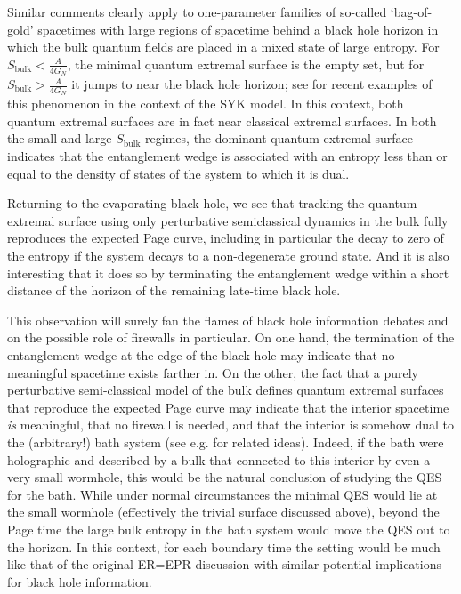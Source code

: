 \documentclass[12pt]{article}
\begin{document}
Similar comments clearly apply to one-parameter families of so-called `bag-of-gold' spacetimes with large regions of spacetime behind a black hole horizon in which the bulk quantum fields are placed in a mixed state of large entropy.  For $S_{\mathrm{bulk}} < \frac{A}{4G_{N}}$, the minimal quantum extremal surface is the empty set, but for $S_{\mathrm{bulk}} > \frac{A}{4G_{N}}$ it jumps to near the black hole horizon; see \cite{Almheiri:2018xdw} for recent examples of this phenomenon in the context of the SYK model. In this context, both quantum extremal surfaces are in fact near classical extremal surfaces.    In both the small and large  $S_{\mathrm{bulk}}$ regimes, the dominant quantum extremal surface indicates that the entanglement wedge is associated with an entropy less than or equal to the density of states of the system to which it is dual.

Returning to the evaporating black hole, we see that tracking the quantum extremal surface using only perturbative semiclassical dynamics in the bulk fully reproduces the expected Page curve, including in particular the decay to zero of the entropy if the system decays to a non-degenerate ground state.  And it is also interesting that it does so by terminating the entanglement wedge within a short distance of the horizon of the remaining late-time black hole.

This observation will surely fan the flames of black hole information debates and on the possible role of firewalls \cite{Almheiri:2012rt,Almheiri:2013hfa,Marolf:2013dba} in particular.  On one hand, the termination of the entanglement wedge at the edge of the black hole may indicate that no meaningful spacetime exists farther in.  On the other, the fact that a purely perturbative semi-classical model of the bulk defines quantum extremal surfaces that reproduce the expected Page curve may indicate that the interior spacetime {\it is} meaningful, that no firewall is needed, and that the interior is somehow dual to the (arbitrary!) bath system (see e.g. \cite{Verlinde:2013qya,Maldacena:2013xja} for related ideas).  Indeed, if the bath were holographic and described by a bulk that connected to this interior by even a very small wormhole, this would be the natural conclusion of studying the QES for the bath.  While under normal circumstances the minimal QES would lie at the small wormhole (effectively the trivial surface discussed above), beyond the Page time the large bulk entropy in the bath system would move the QES out to the horizon.  In this context, for each boundary time the setting would be much like that of the original ER=EPR discussion \cite{Maldacena:2013xja} with similar potential implications for black hole information.
\end{document}
